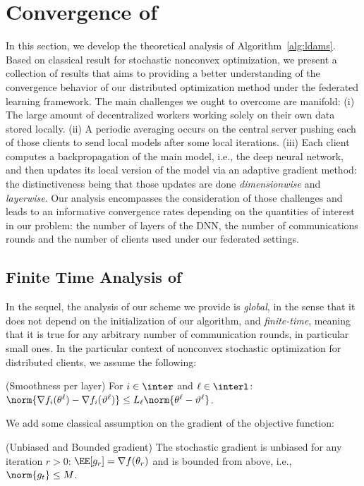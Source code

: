 \documentclass[twoside]{article}
\begin{document}
\vspace{0.2in}
\section{Convergence of \algo}\label{sec:theory}
In this section, we develop the theoretical analysis of Algorithm~\ref{alg:ldams}.  Based on classical result for stochastic nonconvex optimization, we present a collection of results that aims to providing a better understanding of the convergence behavior of our distributed optimization method under the federated learning framework.
The main challenges we ought to overcome are manifold:
(i) The large amount of decentralized workers working solely on their own data stored locally. 
(ii) A periodic averaging occurs on the central server pushing each of those clients to send local models after some local iterations. 
(iii) Each client computes a backpropagation of the main model, i.e., the deep neural network, and then updates its local version of the model via an adaptive gradient method: the distinctiveness being that those updates are done \emph{dimensionwise} and \emph{layerwise}.
Our analysis encompasses the consideration of those challenges and leads to an informative convergence rates depending on the quantities of interest in our problem: the number of layers of the DNN, the number of communications rounds and the number of clients used under our federated settings.

\subsection{Finite Time Analysis of \algo}
In the sequel, the analysis of our scheme we provide is \emph{global}, in the sense that it does not depend on the initialization of our algorithm, and \emph{finite-time}, meaning that it is true for any arbitrary number of communication rounds, in particular small ones.
In the particular context of nonconvex stochastic optimization for distributed clients, we assume the following:

\vspace{0.1in}

\begin{assumption}\label{ass:smooth}(Smoothness per layer)
For $i \in \inter$ and $\ell \in \interl$: $\norm{\nabla f_i (\theta^\ell) - \nabla f_i (\vartheta^\ell)} \leq L_\ell \norm{\theta^\ell-\vartheta^\ell}$.
\end{assumption}
We add some classical assumption on the gradient of the objective function:
\begin{assumption}\label{ass:boundgrad}(Unbiased and Bounded gradient)
The stochastic gradient is unbiased for any iteration $r>0$: $\EE[g_r] = \nabla f(\theta_r)$ and is bounded from above, i.e., $\norm{g_t} \leq M$.
\end{assumption}
\end{document}
